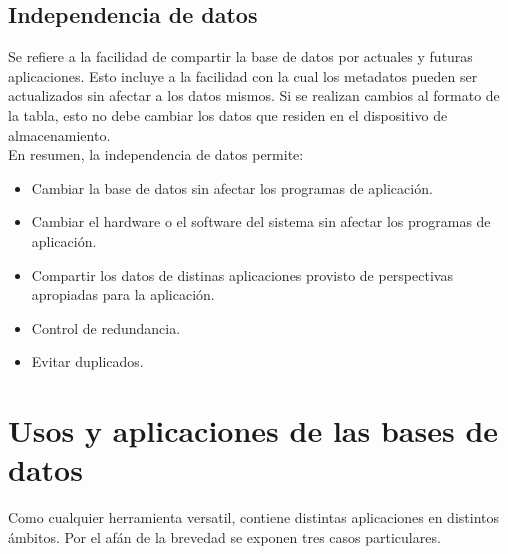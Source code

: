 \documentclass[letterpaper, 12pt]{article}
\begin{document}
\begin{justify}
        \subsection{Independencia de datos}
        \justify
        Se refiere a la facilidad de compartir la base de datos por actuales y futuras aplicaciones. Esto incluye a la facilidad con la cual los metadatos pueden ser actualizados sin afectar a los datos mismos. Si se realizan cambios al formato de la tabla, esto no debe cambiar los datos que residen en el dispositivo
        de almacenamiento.
        \\\newline
        En resumen, la independencia de datos permite:
        \begin{itemize}
            \item Cambiar la base de datos sin afectar los programas de aplicación.
            \item Cambiar el hardware o el software del sistema sin afectar los programas de aplicación.
            \item Compartir los datos de distinas aplicaciones provisto de perspectivas apropiadas para la aplicación.
            \item Control de redundancia.
            \item Evitar duplicados.
        \end{itemize} 
        \section{Usos y aplicaciones de las bases de datos}
        \justify
        Como cualquier herramienta versatil, contiene distintas aplicaciones en distintos ámbitos. Por el afán de la brevedad se exponen tres casos particulares.

\end{justify}
\end{document}
